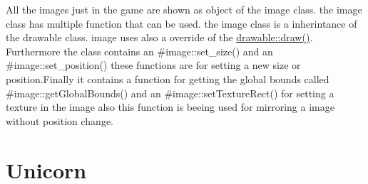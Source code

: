 All the images just in the game are shown as object of the image class. the image class has multiple function that can be used. the image class is a inherintance of the drawable class. image uses also a override of the \hyperlink{classdrawable_a4e49e2c1121704c83ce24c5f48dd910f}{drawable\+::draw()}. Furthermore the class contains an \#image\+::set\+\_\+size() and an \#image\+::set\+\_\+position() these functions are for setting a new size or position.\+Finally it contains a function for getting the global bounds called \#image\+::get\+Global\+Bounds() and an \#image\+::set\+Texture\+Rect() for setting a texture in the image also this function is beeing used for mirroring a image without position change.\hypertarget{index_unicorn}{}\section{Unicorn}\label{index_unicorn}
